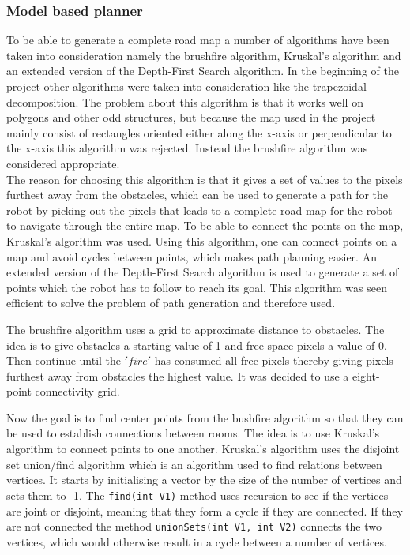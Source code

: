 \documentclass[../Head/Main.tex]{subfiles}
\begin{document}
\subsubsection{Model based planner}
\label{subsec:design_model_based}
To be able to generate a complete road map a number of algorithms have been taken into consideration namely the brushfire algorithm, Kruskal's algorithm and an extended version of the Depth-First Search algorithm. In the beginning of the project other algorithms were taken into consideration like the trapezoidal decomposition. The problem about this algorithm is that it works well on polygons and other odd structures, but because the map used in the project mainly consist of rectangles oriented either along the x-axis or perpendicular to the x-axis this algorithm was rejected. Instead the brushfire algorithm was considered appropriate.\\ 
The reason for choosing this algorithm is that it gives a set of values to the pixels furthest away from the obstacles, which can be used to generate a path for the robot by picking out the pixels that leads to a complete road map for the robot to navigate through the entire map. To be able to connect the points on the map, Kruskal's algorithm was used. Using this algorithm, one can connect points on a map and avoid cycles between points, which makes path planning easier. An extended version of the Depth-First Search algorithm is used to generate a set of points which the robot has to follow to reach its goal. This algorithm was seen efficient to solve the problem of path generation and therefore used.\par 

The brushfire algorithm uses a grid to approximate distance to obstacles. The idea is to give obstacles a starting value of 1 and free-space pixels a value of 0. Then continue until the $'fire'$ has consumed all free pixels thereby giving pixels furthest away from obstacles the highest value. It was decided to use a eight-point connectivity grid. \par
{}

Now the goal is to find center points from the bushfire algorithm so that they can be used to establish connections between rooms. The idea is to use Kruskal's algorithm to connect points to one another.  Kruskal's algorithm uses the disjoint set union/find algorithm which is an algorithm used to find relations between vertices. It starts by initialising a vector by the size of the number of vertices and sets them to -1. The \texttt{find(int V1)} method uses recursion to see if the vertices are joint or disjoint, meaning that they form a cycle if they are connected. If they are not connected the method  \texttt{unionSets(int V1, int V2)} connects the two vertices, which would otherwise result in a cycle between a number of vertices.
\end{document}
